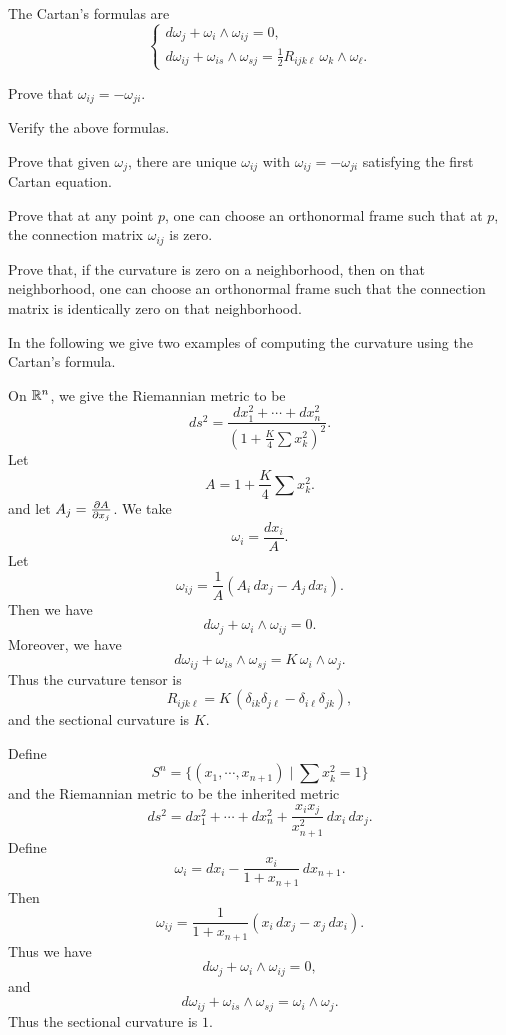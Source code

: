 The Cartan's formulas are
\[
\left\{
\begin{array}{l}
d\omega_j+\omega_i\wedge\omega_{ij}=0,\\
d\omega_{ij}+\omega_{is}\wedge\omega_{sj}=\frac 12 R_{ijk\ell}\,\omega_k\wedge\omega_\ell.
\end{array}
\right.
\]

\begin{ex} Prove that $\omega_{ij}=-\omega_{ji}$.\end{ex}

\begin{ex} Verify the above formulas.
\end{ex}


\begin{ex} Prove that given $\omega_j$, there are unique $\omega_{ij}$ with $\omega_{ij}=-\omega_{ji}$ satisfying the first Cartan equation.
\end{ex}


\begin{ex} Prove that at any point $p$, one can choose an orthonormal frame such that at $p$, the connection matrix $\omega_{ij}$ is zero.
\end{ex}

\begin{ex} Prove that, if the curvature is zero on a neighborhood, then on that neighborhood, one can choose an orthonormal  frame such that the connection matrix is identically zero on that neighborhood.
\end{ex}

In the following we give two examples of computing the curvature using the Cartan's formula. 

\begin{example}
On $\mathbb R^n$, we give the Riemannian metric to be
\[
ds^2=\frac{dx_1^2+\cdots +dx_n^2}{(1+\frac K4\sum x_k^2)^2}.
\]
Let
\[
A=1+\frac K4\sum x_k^2.
\]
and let $A_j=\frac{\partial A}{\partial x_j}$. We take 
\[
\omega_i=\frac{dx_i}{A}.
\]
Let
\[
\omega_{ij}=\frac{1}{A}(A_i\,dx_j-A_j\,dx_i).
\]
Then we have
\[
d\omega_j+\omega_i\wedge\omega_{ij}=0.
\]
Moreover, we have
\[
d\omega_{ij}+\omega_{is}\wedge\omega_{sj}=K\,\omega_i\wedge\omega_j.
\]
Thus the curvature tensor is
\[
R_{ijk\ell}=K\,(\delta_{ik}\delta_{j\ell}-\delta_{i\ell}\delta_{jk}),
\]
and the sectional curvature is $K$.
\end{example}

\begin{example}
Define
\[
S^n=\{(x_1,\cdots,x_{n+1})\mid \sum x_k^2=1\}
\]
and the Riemannian metric to be the inherited metric 
\[
ds^2=dx_1^2+\cdots +dx_n^2+\frac{x_ix_j}{x^2_{n+1}}\, dx_i\,dx_j.
\]
Define
\[
\omega_i=dx_i-\frac{x_i}{1+x_{n+1}}\,dx_{n+1}.
\]
Then
\[
\omega_{ij}=\frac{1}{1+x_{n+1}}(x_i\,dx_j-x_j\,dx_i).
\]
Thus we have
\[
d\omega_j+\omega_i\wedge\omega_{ij}=0,
\]
and
\[
d\omega_{ij}+\omega_{is}\wedge\omega_{sj}=\omega_i\wedge\omega_j.
\]
Thus the sectional curvature is $1$.
\end{example}


